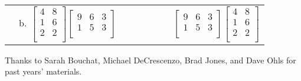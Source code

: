 \documentclass[11pt]{article}
\begin{document}
\begin{enumerate}
\begin{tabular}{cccc}
&
b. $\left[\begin{array}{cc}
4 & 8 \\
1 & 6 \\
2 & 2 \\
\end{array}\right]
\left[\begin{array}{ccc}
9 & 6 & 3 \\
1 & 5 & 3 \\
\end{array}\right]$
&
~~~~~~~~
&
$\left[\begin{array}{ccc}
9 & 6 & 3 \\
1 & 5 & 3 \\
\end{array}\right]
\left[\begin{array}{cc}
4 & 8 \\
1 & 6 \\
2 & 2 \\
\end{array}\right]$
\end{tabular}




\end{enumerate}



\vfill
\begin{center}
\small{Thanks to Sarah Bouchat, Michael DeCrescenzo, Brad Jones, and Dave Ohls for past years' materials.}
\end{center}
\end{document}
